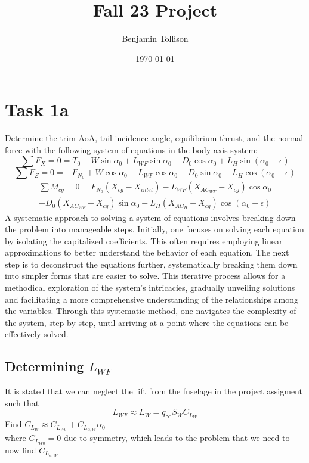 \documentclass[a4paper, twoside]{article}
\date{\monthyeardate\today}
\author{Benjamin Tollison}
\title{Fall 23 Project}
\begin{document}
% 

\tableofcontents
\newpage
\section{Task 1a}
Determine the trim AoA, tail incidence angle, equilibrium thrust, and the normal force with the following system of equations in the body-axis system:
\[\sum{F_X} = 0 = T_0 - W\sin\alpha_0 + L_{WF}\sin\alpha_0-D_0\cos\alpha_0 + L_H\sin(\alpha_0-\epsilon)\]
\[\sum{F_Z}=0 = -F_{N_0} + W\cos\alpha_0 - L_{WF}\cos\alpha_0-D_0\sin\alpha_0 - L_H\cos(\alpha_0-\epsilon)\]
\begin{align*}
\sum{M_{cg}}= 0 = F_{N_0}(X_{cg}-X_{inlet}) - L_{WF}(X_{AC_{WF}}-X_{cg})\cos\alpha_0\\
- D_0(X_{AC_{WF}}-X_{cg})\sin\alpha_0 - L_{H}(X_{AC_{H}}-X_{cg})\cos(\alpha_0-\epsilon)
\end{align*}
A systematic approach to solving a system of equations involves breaking down the problem into manageable steps. 
Initially, one focuses on solving each equation by isolating the capitalized coefficients. 
This often requires employing linear approximations to better understand the behavior of each equation. 
The next step is to deconstruct the equations further, systematically breaking them down into simpler forms that are easier to solve. 
This iterative process allows for a methodical exploration of the system's intricacies, 
gradually unveiling solutions and facilitating a more comprehensive understanding of the relationships among the variables. 
Through this systematic method, one navigates the complexity of the system, step by step, until arriving at a point where the 
equations can be effectively solved.
\subsection{Determining \(L_{WF}\)}
It is stated that we can neglect the lift from the fuselage in the project assigment such that
\[L_{WF} \approx L_W = q_\infty S_W C_{L_W}\]
Find \(C_{L_W} \approx C_{L_{W0}} + C_{L_{\alpha,W}} \alpha_0\)\\
where \(C_{L_{W0}}=0\) due to symmetry, which leads to the problem that we need to now find \(C_{L_{\alpha,W}}\)
\end{document}
